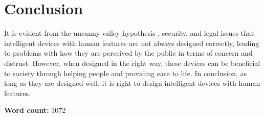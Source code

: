 \documentclass{article}
\begin{document}
\section{Conclusion}
It is evident from the uncanny valley hypothesis \cite{mori1970valley}, security, and legal issues that intelligent devices with human features are not always designed correctly, leading to problems with how they are perceived by the public in terms of concern and distrust. However, when designed in the right way, these devices can be beneficial to society through helping people and providing ease to life. In conclusion, as long as they are designed well, it is right to design intelligent devices with human features.

\vspace{.5cm}
\noindent \textbf{Word count:} 1072



\end{document}
